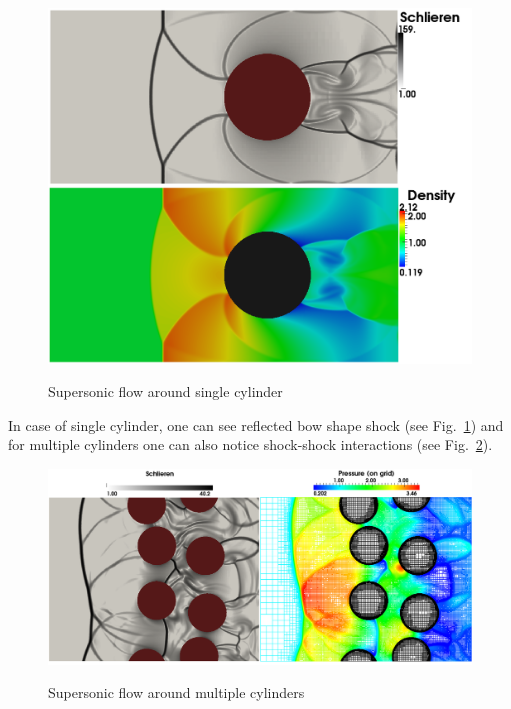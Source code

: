 \begin{figure}[h!]
\centering \includegraphics[scale=0.3]{fig/single_res.png}\\
\caption{Supersonic flow around single cylinder \label{fig:single_res}}
\end{figure}
In case of single cylinder, one can see reflected bow shape shock (see Fig.~\ref{fig:single_res}) and for multiple cylinders one can also notice shock-shock interactions (see Fig.~\ref{fig:mult_res}).
\begin{figure}[t]
\centering \includegraphics[scale=0.35]{fig/mult_res.png}\\
\caption{Supersonic flow around multiple cylinders \label{fig:mult_res}}
\end{figure}
